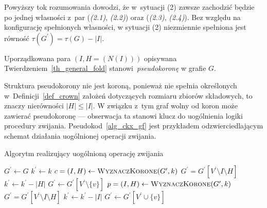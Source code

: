 {\begin{bproof}
\begin{itemize}
      Powyższy tok rozumowania dowodzi, że w~sytuacji (2) zawsze zachodzić będzie po jednej własności z~par (\textit{(2.1)}, \textit{(2.2)}) oraz (\textit{(2.3)}, \textit{(2.4)}).
      Bez względu na konfigurację spełnionych własności, w sytuacji (2) niezmiennie spełniona jest równość $\tau(G^\prime)=\tau(G)-|I|$.
    \end{itemize}
  \end{bproof}

  \begin{definition}
    Uporządkowana para $(I, H=(N(I)))$ opisywana Twierdzeniem~\ref{th_general_fold} stanowi~\emph{pseudokoronę} w grafie $G$.
  \end{definition}

  Struktura pseudokorony nie jest koroną, ponieważ nie spełnia określonych w~Definicji~\ref{def_crown} założeń dotyczących rozmiaru zbiorów składowych, to znaczy nierówności $|H| \leq |I|$.
  W związku z~tym graf wolny od koron może zawierać pseudokoronę --- obserwacja ta stanowi klucz do uogólnienia logiki procedury zwijania.
  Pseudokod~\ref{alg_ckx_gf} jest przykładem odzwierciedlającym schemat działania uogólnionej operacji zwijania.
  \begin{algorithm}
    \caption{Algorytm realizujący uogólnioną operację zwijania}\label{alg_ckx_gf}
    \begin{algorithmic}[1]


        \State $G^\prime \gets G$
        \State $k^\prime \gets k$
        \State $c=(I, H) \gets \Call{WyznaczKorone}{G^\prime, k}$
          \State $G^\prime = G^\prime[V^\prime \setminus I \setminus H]$
          \State $k^\prime \gets k^\prime - |H|$
        \EndWhile
          \State $G^\prime \gets G^\prime[V^\prime \setminus \{v\}]$
          \State $p=(I, H) \gets \Call{WyznaczKorone}{G^\prime, k}$
            \State $G^\prime = G^\prime[V^\prime \setminus I \setminus H]$
            \State $k^\prime \gets k^\prime - |I|$
          \EndIf
          \State $G^\prime \gets G^\prime[V^\prime \cup \{v\}]$
        \EndFor
      \EndFunction
    \end{algorithmic}
  \end{algorithm}
}

